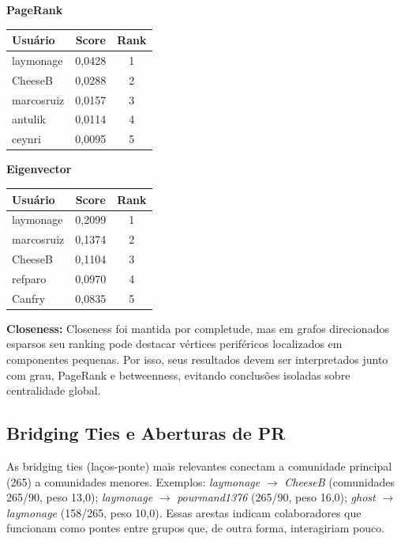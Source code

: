 \documentclass[12pt]{article}
\begin{document}
\begin{table}[H]
\begin{minipage}[t]{0.48\textwidth}
\centering
\textbf{PageRank}\\[2pt]
\begin{tabular}{|l|c|c|}
\hline
\textbf{Usuário} & \textbf{Score} & \textbf{Rank} \\
\hline laymonage & 0,0428 & 1 \\
\hline CheeseB & 0,0288 & 2 \\
\hline marcosruiz & 0,0157 & 3 \\
\hline antulik & 0,0114 & 4 \\
\hline ceynri & 0,0095 & 5 \\
\hline
\end{tabular}
\label{tab:pagerank}
\end{minipage}\hfill
\begin{minipage}[t]{0.48\textwidth}
\centering
\textbf{Eigenvector}\\[2pt]
\begin{tabular}{|l|c|c|}
\hline
\textbf{Usuário} & \textbf{Score} & \textbf{Rank} \\
\hline laymonage & 0,2099 & 1 \\
\hline marcosruiz & 0,1374 & 2 \\
\hline CheeseB & 0,1104 & 3 \\
\hline refparo & 0,0970 & 4 \\
\hline Canfry & 0,0835 & 5 \\
\hline
\end{tabular}
\label{tab:eigenvector}
\end{minipage}
\end{table}

\textbf{Closeness:} Closeness foi mantida por completude, mas em grafos direcionados esparsos seu ranking pode destacar vértices periféricos localizados em componentes pequenas. Por isso, seus resultados devem ser interpretados junto com grau, PageRank e betweenness, evitando conclusões isoladas sobre centralidade global.

\subsection{Bridging Ties e Aberturas de PR}

As bridging ties (laços-ponte) mais relevantes conectam a comunidade principal (265) a comunidades menores. Exemplos: \textit{laymonage} $\rightarrow$ \textit{CheeseB} (comunidades 265/90, peso 13,0); \textit{laymonage} $\rightarrow$ \textit{pourmand1376} (265/90, peso 16,0); \textit{ghost} $\rightarrow$ \textit{laymonage} (158/265, peso 10,0). Essas arestas indicam colaboradores que funcionam como pontes entre grupos que, de outra forma, interagiriam pouco.
\end{document}
